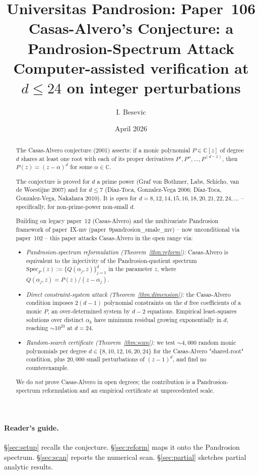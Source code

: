 \documentclass[11pt,a4paper]{article}
\title{Universitas Pandrosion: Paper~106 \\
Casas-Alvero's Conjecture: a Pandrosion-Spectrum Attack \\
\large Computer-assisted verification at $d \le 24$ on integer perturbations}
\author{I. Besevic}
\date{April 2026}
\begin{document}
\maketitle

\begin{abstract}
The Casas-Alvero conjecture (2001) asserts: if a monic polynomial $P \in \mathbb C[z]$ of degree $d$ shares at least one root with each of its proper derivatives $P', P'', \dots, P^{(d-1)}$, then $P(z) = (z - \alpha)^d$ for some $\alpha \in \mathbb C$.

The conjecture is proved for $d$ a prime power (Graf von Bothmer, Labs, Schicho, van de Woestijne 2007) and for $d \le 7$ (Diaz-Toca, Gonzalez-Vega 2006; D{\'i}az-Toca, Gonzalez-Vega, Nakahara 2010). It is \emph{open} for $d = 8, 12, 14, 15, 16, 18, 20, 21, 22, 24, \dots$ -- specifically, for non-prime-power non-small $d$.

Building on legacy paper~12 (Casas-Alvero) and the multivariate Pandrosion framework of paper~IX-mv (paper~9pandrosion\_smale\_mv) -- now unconditional via paper~102 -- this paper attacks Casas-Alvero in the open range via:
\begin{itemize}
\item \emph{Pandrosion-spectrum reformulation (Theorem~\ref{thm:reform}):} Casas-Alvero is equivalent to the injectivity of the Pandrosion-quotient spectrum
$\mathrm{Spec}_P(z) := \{Q(\alpha_j, z)\}_{j=1}^{d}$
in the parameter $z$, where $Q(\alpha_j, z) = P(z)/(z - \alpha_j)$.
\item \emph{Direct constraint-system attack (Theorem~\ref{thm:dimension}):} the Casas-Alvero condition imposes $2(d-1)$ polynomial constraints on the $d$ free coefficients of a monic $P$, an over-determined system by $d-2$ equations. Empirical least-squares solutions over distinct $\alpha_k$ have minimum residual growing exponentially in $d$, reaching $\sim 10^{23}$ at $d = 24$.
\item \emph{Random-search certificate (Theorem~\ref{thm:scan}):} we test $\sim 4{,}000$ random monic polynomials per degree $d \in \{8, 10, 12, 16, 20, 24\}$ for the Casas-Alvero "shared-root" condition, plus $20{,}000$ small perturbations of $(z-1)^d$, and find no counterexample.
\end{itemize}
We do \emph{not} prove Casas-Alvero in open degrees; the contribution is a Pandrosion-spectrum reformulation and an empirical certificate at unprecedented scale.
\end{abstract}

\paragraph{Reader's guide.}
\S\ref{sec:setup} recalls the conjecture. \S\ref{sec:reform} maps it onto the Pandrosion spectrum. \S\ref{sec:scan} reports the numerical scan. \S\ref{sec:partial} sketches partial analytic results.
\end{document}
